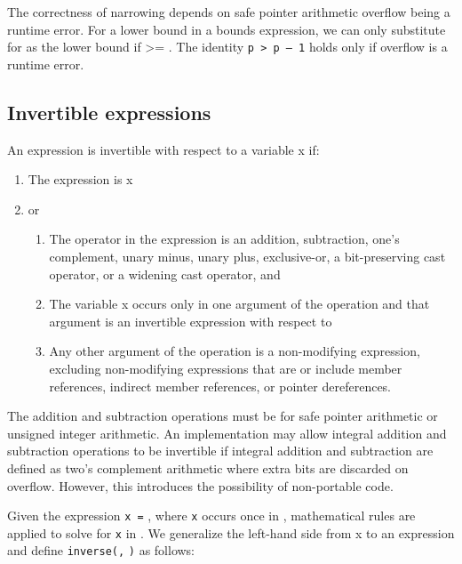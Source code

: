 The correctness of narrowing depends on safe pointer arithmetic overflow
being a runtime error. For a lower bound  in a bounds
expression, we can only substitute  for  as the lower
bound if  \textgreater{}= . The identity \texttt{p
\textgreater{} p -- 1} holds only if overflow is a runtime error.

\subsection{Invertible expressions}\label{invertible-expressions}

An expression is invertible with respect to a variable x if:

\begin{enumerate}
\item
  The expression is x
\item
  or

  \begin{enumerate}
  \item
    The operator in the expression is an addition, subtraction, one's
    complement, unary minus, unary plus, exclusive-or, a bit-preserving
    cast operator, or a widening cast operator, and
  \item
    The variable x occurs only in one argument of the operation and that
    argument is an invertible expression with respect to 
  \item
    Any other argument of the operation is a non-modifying expression,
    excluding non-modifying expressions that are or include member
    references, indirect member references, or pointer dereferences.
  \end{enumerate}
\end{enumerate}

The addition and subtraction operations must be for safe pointer
arithmetic or unsigned integer arithmetic. An implementation may allow
integral addition and subtraction operations to be invertible if
integral addition and subtraction are defined as two's complement
arithmetic where extra bits are discarded on overflow. However, this
introduces the possibility of non-portable code.

Given the expression \texttt{x =} , where \texttt{x} occurs once
in , mathematical rules are applied to solve for \texttt{x} in
. We generalize the left-hand side from x to an expression
 and define \texttt{inverse(}\texttt{,}
\texttt{)} as follows:

